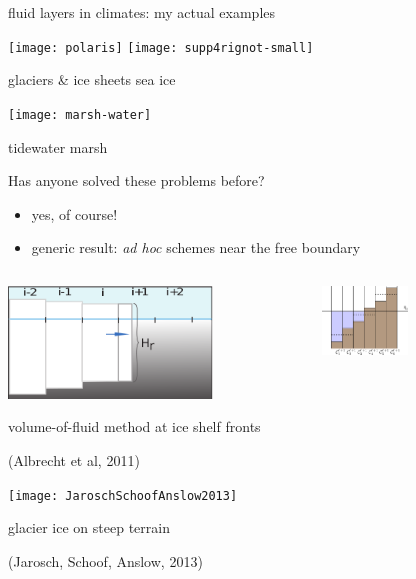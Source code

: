 \documentclass[xcolor={dvipsnames}]{beamer}
\begin{document}
\begin{frame}{fluid layers in climates: my actual examples}

\texttt{[image: polaris]}
\hfill
\texttt{[image: supp4rignot-small]}

\small glaciers \& ice sheets \hfill sea ice

\medskip
\begin{center}
\texttt{[image: marsh-water]}

\small tidewater marsh
\end{center}
\end{frame}


\begin{frame}{Has anyone solved these problems before?}

\vspace{-2mm}

  \begin{itemize}
  \item yes, of course!
  \item generic result: \emph{ad hoc} schemes near the free boundary
  \end{itemize}

\medskip
\begin{columns}
\begin{column}{0.45\textwidth}
\includegraphics[width=0.7\textwidth,keepaspectratio=true]{Albrechtetal2011half}

\scriptsize volume-of-fluid method at ice shelf fronts

\tiny (Albrecht et al, 2011)

\medskip
\texttt{[image: JaroschSchoofAnslow2013]}

\scriptsize glacier ice on steep terrain

\smallskip
\tiny (Jarosch, Schoof, Anslow, 2013)
\end{column}

\begin{column}{0.5\textwidth}
\hfill \includegraphics[width=0.45\textwidth,keepaspectratio=true]{LeVequeGeorgeBerger2011}


\end{column}
\end{columns}
\end{frame}
\end{document}
